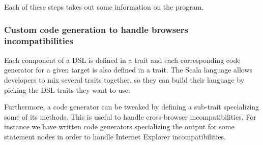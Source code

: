 \documentclass[american,english,runningheads]{llncs}
\newcommand{\eg}{\emph{e.g.}}
\begin{document}
Each of these steps takes out some information on the program.

\subsubsection{Custom code generation to handle browsers incompatibilities}

Each component of a DSL is defined in a trait and each corresponding code generator for a given target is also defined in a trait. The Scala language allows developers to mix several traits together, so they can build their language by picking the DSL traits they want to use.

Furthermore, a code generator can be tweaked by defining a sub-trait specializing some of its methods. This is useful to handle cross-browser incompatibilities. For instance we have written code generators specializing the output for some statement nodes in order to handle Internet Explorer incompatibilities.

% 
% 
% 
% 
% 
% 
\end{document}
